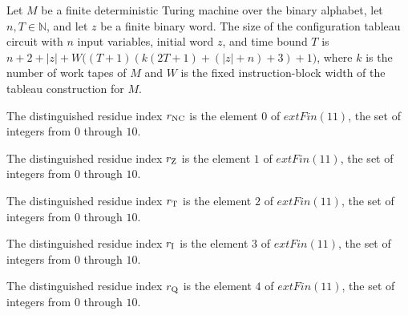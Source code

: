 \begin{theorem}
\label{Complexity.cfgTab_size}
\leanok
{}
Let $M$ be a finite deterministic Turing machine over the binary alphabet, let
$n,T\in\mathbb{N}$, and let $z$ be a finite binary word. The size of the configuration
tableau circuit with $n$ input variables, initial word $z$, and time bound $T$ is
$n+2+|z|+W\bigl((T+1)(k(2T+1)+(|z|+n)+3)+1\bigr)$, where $k$ is the number of work tapes
of $M$ and $W$ is the fixed instruction-block width of the tableau construction for $M$.
\end{theorem}

\begin{definition}
\label{Complexity.UTab.rNC}
\leanok
The distinguished residue index $r_{\rm NC}$ is the element $0$ of $	ext{Fin}(11)$, the
set of integers from $0$ through $10$.
\end{definition}

\begin{definition}
\label{Complexity.UTab.rZ}
\leanok
The distinguished residue index $r_{\rm Z}$ is the element $1$ of $	ext{Fin}(11)$, the
set of integers from $0$ through $10$.
\end{definition}

\begin{definition}
\label{Complexity.UTab.rT}
\leanok
The distinguished residue index $r_{\rm T}$ is the element $2$ of $	ext{Fin}(11)$, the
set of integers from $0$ through $10$.
\end{definition}

\begin{definition}
\label{Complexity.UTab.rI}
\leanok
The distinguished residue index $r_{\rm I}$ is the element $3$ of $	ext{Fin}(11)$, the
set of integers from $0$ through $10$.
\end{definition}

\begin{definition}
\label{Complexity.UTab.rQ}
\leanok
The distinguished residue index $r_{\rm Q}$ is the element $4$ of $	ext{Fin}(11)$, the
set of integers from $0$ through $10$.
\end{definition}

